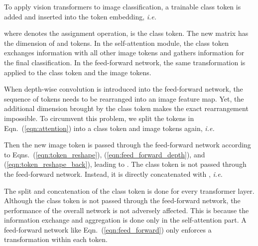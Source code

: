 \documentclass[10pt,twocolumn,letterpaper]{article}
\def\ie{\emph{i.e.\ }}
\begin{document}
To apply vision transformers to image classification, a trainable class token is added and inserted into the token embedding, \ie 

where  denotes the assignment operation,  is the class token. The new matrix has the dimension of  and  tokens. In the self-attention module, the class token exchanges information with all other image tokens and gathers information for the final classification. In the feed-forward network, the same transformation is applied to the class token and the image tokens. 

When depth-wise convolution is introduced into the feed-forward network, the sequence of tokens needs to be rearranged into an image feature map. Yet, the additional dimension brought by the class token makes the exact rearrangement impossible. To circumvent this problem, we split the  tokens in Eqn.~(\ref{eqn:attention}) into a class token and image tokens again, \ie
 
Then the new image token is passed through the feed-forward network according to Eqns.~(\ref{eqn:token_reshape}), (\ref{eqn:feed_forward_depth}), and (\ref{eqn:token_reshape_back}), leading to . The class token is not passed through the feed-forward network. Instead, it is directly concatenated with , \ie 

The split and concatenation of the class token is done for every transformer layer. Although the class token  is not passed through the feed-forward network, the performance of the overall network is not adversely affected. This is because the information exchange and aggregation is done only in the self-attention part. A feed-forward network like Eqn.~(\ref{eqn:feed_forward}) only enforces a transformation within each token.
\end{document}
